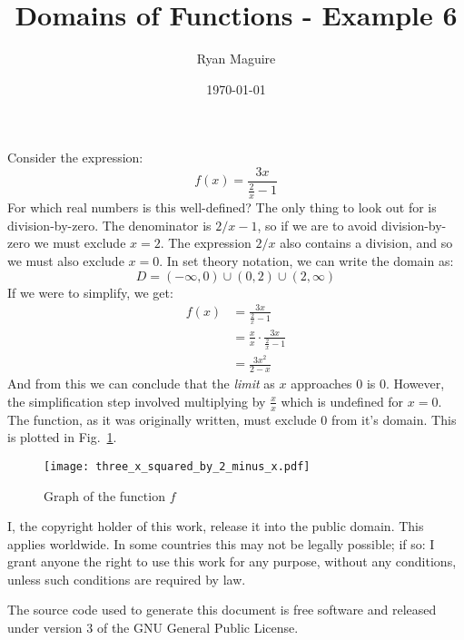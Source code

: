 \documentclass{article}
\title{Domains of Functions - Example 6}
\author{Ryan Maguire}
\date{\today}
\begin{document}
    \maketitle
    Consider the expression:
    \begin{equation}
        f(x)=\frac{3x}{\frac{2}{x}-1}
    \end{equation}
    For which real numbers is this well-defined? The only thing to look out for
    is division-by-zero. The denominator is $2/x-1$, so if we are to avoid
    division-by-zero we must exclude $x=2$. The expression $2/x$ also
    contains a division, and so we must also exclude $x=0$. In set theory
    notation, we can write the domain as:
    \begin{equation}
        D=(-\infty,0)\cup(0,2)\cup(2,\infty)
    \end{equation}
    If we were to simplify, we get:
    \begin{align}
        f(x)&=\frac{3x}{\frac{2}{x}-1}\\
            &=\frac{x}{x}\cdot\frac{3x}{\frac{2}{x}-1}\\
            &=\frac{3x^{2}}{2-x}
    \end{align}
    And from this we can conclude that the \textit{limit} as $x$ approaches
    0 is 0. However, the simplification step involved multiplying by
    $\frac{x}{x}$ which is undefined for $x=0$. The function, as it was
    originally written, must exclude 0 from it's domain. This is
    plotted in Fig.~\ref{fig:graph_of_func}.
    \begin{figure}
        \centering
        \texttt{[image: three\_x\_squared\_by\_2\_minus\_x.pdf]}
        \caption{Graph of the function $f$}
        \label{fig:graph_of_func}
    \end{figure}
    \newpage
    I, the copyright holder of this work, release it into the public domain.
    This applies worldwide. In some countries this may not be legally possible;
    if so: I grant anyone the right to use this work for any purpose, without
    any conditions, unless such conditions are required by law.
    \par\hfill\par
    The source code used to generate this document is free software and released
    under version 3 of the GNU General Public License.
\end{document}
